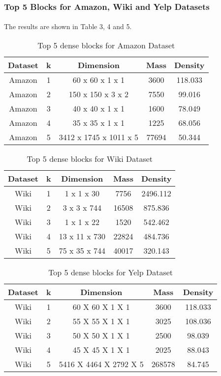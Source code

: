 \subsubsection{Top 5 Blocks for Amazon, Wiki and Yelp Datasets}
\paragraph{}
The results are shown in Table 3, 4 and 5.
\begin{table}
\centering
\begin{tabular}{|c|c|c|c|c|}
    \hline
        Dataset & k & Dimension & Mass & Density \\
    \hline
        Amazon & 1 & 60 x 60 x 1 x 1 & 3600 & 118.033 \\
    \hline
        Amazon & 2 & 150 x 150 x 3 x 2 & 7550 & 99.016 \\
    \hline
        Amazon & 3 & 40 x 40 x 1 x 1 & 1600 & 78.049 \\
    \hline
        Amazon & 4 & 35 x 35 x 1 x 1 & 1225 & 68.056 \\
    \hline
        Amazon & 5 & 3412 x 1745 x 1011 x 5 & 77694 & 50.344 \\
    \hline
\end{tabular}
\caption {Top 5 dense blocks for Amazon Dataset}
\end{table}
\begin{table}
\centering
\begin{tabular}{|c|c|c|c|c|}
    \hline
        Dataset & k & Dimension & Mass & Density \\
    \hline
        Wiki & 1 & 1 x 1 x 30 & 7756 & 2496.112 \\
    \hline
        Wiki & 2 & 3 x 3 x 744 & 16508 & 875.836 \\
    \hline
        Wiki & 3 & 1 x 1 x 22 & 1520 & 542.462 \\
    \hline
        Wiki & 4 & 13 x 11 x 730 & 22824 & 484.736 \\
    \hline
        Wiki & 5 & 75 x 35 x 744 & 40017 & 320.143 \\
    \hline
\end{tabular}
\caption {Top 5 dense blocks for Wiki Dataset}
\end{table}
\begin{table}
\centering
\begin{tabular}{|c|c|c|c|c|}
    \hline
        Dataset & k & Dimension & Mass & Density \\
    \hline
        Wiki & 1 & 60 X 60 X 1 X 1 & 3600 & 118.033 \\
    \hline
        Wiki & 2 & 55 X 55 X 1 X 1 & 3025 & 108.036 \\
    \hline
        Wiki & 3 & 50 X 50 X 1 X 1 & 2500 & 98.039 \\
    \hline
        Wiki & 4 & 45 X 45 X 1 X 1 & 2025 & 88.043 \\
    \hline
        Wiki & 5 & 5416 X 4464 X 2792 X 5 & 268578 & 84.745 \\
    \hline
\end{tabular}
\caption {Top 5 dense blocks for Yelp Dataset}
\end{table}
